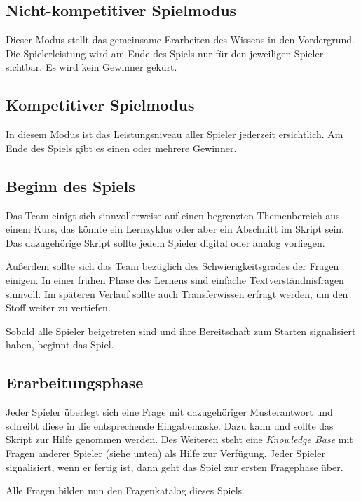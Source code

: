 \documentclass[a4paper,11pt,listof=numbered,glossary=totoc,parskip=half,toc=bib]{scrreprt}
\begin{document}
{\subsection{Nicht-kompetitiver Spielmodus}

Dieser Modus stellt das gemeinsame Erarbeiten des Wissens in den Vordergrund. Die Spielerleistung wird am Ende des Spiels nur für den jeweiligen Spieler sichtbar. Es wird kein Gewinner gekürt.

\subsection{Kompetitiver Spielmodus}

In diesem Modus ist das Leistungsniveau aller Spieler jederzeit ersichtlich. Am Ende des Spiels gibt es einen oder mehrere Gewinner.


\subsection{Beginn des Spiels}

Das Team einigt sich sinnvollerweise auf einen begrenzten Themenbereich aus einem Kurs, das könnte ein Lernzyklus oder aber ein Abschnitt im Skript sein. Das dazugehörige Skript sollte jedem Spieler digital oder analog vorliegen.

Außerdem sollte sich das Team bezüglich des Schwierigkeitsgrades der Fragen einigen. In einer frühen Phase des Lernens sind einfache Textverständnisfragen sinnvoll. Im späteren Verlauf sollte auch Transferwissen erfragt werden, um den Stoff weiter zu vertiefen.

Sobald alle Spieler beigetreten sind und ihre Bereitschaft zum Starten signalisiert haben, beginnt das Spiel. 



\subsection{Erarbeitungsphase}

Jeder Spieler überlegt sich eine Frage mit dazugehöriger \frqq{}Musterantwort\flqq{} und schreibt diese in die entsprechende Eingabemaske. Dazu kann und sollte das Skript zur Hilfe genommen werden. Des Weiteren steht eine \textit{Knowledge Base} mit Fragen anderer Spieler (siehe unten) als Hilfe zur Verfügung. Jeder Spieler signalisiert, wenn er fertig ist, dann geht das Spiel zur ersten Fragephase über.

Alle Fragen bilden nun den Fragenkatalog dieses Spiels.

}
\end{document}
